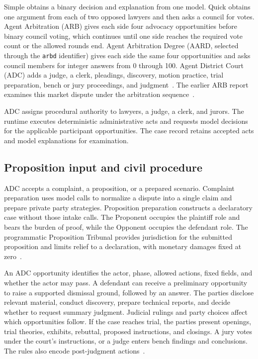 \documentclass[11pt]{article}
\newcommand{\code}[1]{\texttt{#1}}
\begin{document}
Simple obtains a binary decision and explanation from one model.  Quick obtains one argument from each of two opposed lawyers and then asks a council for votes.  Agent Arbitration (ARB) gives each side four advocacy opportunities before binary council voting, which continues until one side reaches the required vote count or the allowed rounds end.  Agent Arbitration Degree (AARD, selected through the \code{arbd} identifier) gives each side the same four opportunities and asks council members for integer answers from 0 through 100.  Agent District Court (ADC) adds a judge, a clerk, pleadings, discovery, motion practice, trial preparation, bench or jury proceedings, and judgment~\cite{procedures}.  The earlier ARB report examines this market dispute under the arbitration sequence~\cite{arbpaper}.

ADC assigns procedural authority to lawyers, a judge, a clerk, and jurors.  The runtime executes deterministic administrative acts and requests model decisions for the applicable participant opportunities.  The case record retains accepted acts and model explanations for examination.

\subsection{Proposition input and civil procedure}

ADC accepts a complaint, a proposition, or a prepared scenario.  Complaint preparation uses model calls to normalize a dispute into a single claim and prepare private party strategies.  Proposition preparation constructs a declaratory case without those intake calls.  The Proponent occupies the plaintiff role and bears the burden of proof, while the Opponent occupies the defendant role.  The programmatic Proposition Tribunal provides jurisdiction for the submitted proposition and limits relief to a declaration, with monetary damages fixed at zero~\cite{adcmanual}.

An ADC opportunity identifies the actor, phase, allowed actions, fixed fields, and whether the actor may pass.  A defendant can receive a preliminary opportunity to raise a supported dismissal ground, followed by an answer.  The parties disclose relevant material, conduct discovery, prepare technical reports, and decide whether to request summary judgment.  Judicial rulings and party choices affect which opportunities follow.  If the case reaches trial, the parties present openings, trial theories, exhibits, rebuttal, proposed instructions, and closings.  A jury votes under the court's instructions, or a judge enters bench findings and conclusions.  The rules also encode post-judgment actions~\cite{practice,arcp}.
\end{document}
